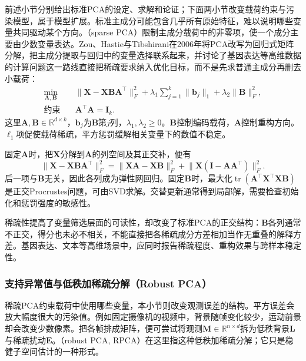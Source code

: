 前述小节分别给出标准PCA的设定、求解和论证；下面两小节改变载荷约束与污染模型，属于模型扩展。标准主成分可能包含几乎所有原始特征，难以说明哪些变量共同驱动某个方向。（sparse PCA）限制主成分载荷中的非零项，使一个成分主要由少数变量表达。Zou、Hastie与Tibshirani在2006年将PCA改写为回归式矩阵分解，把主成分提取与回归中的变量选择联系起来，并讨论了基因表达等高维数据的计算问题这一路线直接把稀疏要求纳入优化目标，而不是先求普通主成分再删去小载荷：
\begin{equation}
  \begin{aligned}
  \min_{\bm{A},\bm{B}}\quad&
    \lVert\bm{X}-\bm{X}\bm{B}\bm{A}^{\top}\rVert_F^2
    +\lambda_1\sum_{j=1}^{k}\lVert\bm{b}_j\rVert_1
    +\lambda_2\lVert\bm{B}\rVert_F^2,\\
  \text{约束}\quad&\bm{A}^{\top}\bm{A}=\bm{I}_k.
  \end{aligned}
  \label{eq:dim-sparse-pca}
\end{equation}
这里$\bm{A},\bm{B}\in\mathbb{R}^{d\times k}$，$\bm{b}_j$为$\bm{B}$第$j$列，$\lambda_1,\lambda_2\geq0$。$\bm{B}$控制编码载荷，$\bm{A}$控制重构方向。$\ell_1$项促使载荷稀疏，平方惩罚缓解相关变量下的数值不稳定。

固定$\bm{A}$时，把$\bm{X}$分解到$\bm{A}$的列空间及其正交补，便有
\[
  \lVert\bm{X}-\bm{X}\bm{B}\bm{A}^{\top}\rVert_F^2
  =\lVert\bm{X}\bm{A}-\bm{X}\bm{B}\rVert_F^2
   +\lVert\bm{X}(\bm{I}-\bm{A}\bm{A}^{\top})\rVert_F^2.
\]
后一项与$\bm{B}$无关，因此各列成为弹性网回归。固定$\bm{B}$时，最大化$\operatorname{tr}(\bm{A}^{\top}\bm{X}^{\top}\bm{X}\bm{B})$是正交Procrustes问题，可由SVD求解。交替更新通常得到局部解，需要检查初始化和惩罚强度的敏感性。

稀疏性提高了变量筛选层面的可读性，却改变了标准PCA的正交结构：$\bm{B}$各列通常不正交，得分也未必不相关，不能直接把各稀疏成分方差相加当作无重叠的解释方差。基因表达、文本等高维场景中，应同时报告稀疏程度、重构效果与跨样本稳定性。

\subsubsection{支持异常值与低秩加稀疏分解（Robust PCA）}
\label{sec:dim-robust-pca}

稀疏PCA约束载荷中使用哪些变量，本小节则改变观测误差的结构。平方误差会放大幅度很大的污染值。例如固定摄像机的视频中，背景随帧变化较少，运动前景却会改变少数像素。把各帧排成矩阵，便可尝试将观测$\bm{M}\in\mathbb{R}^{n\times d}$拆为低秩背景$\bm{L}$与稀疏扰动$\bm{E}$。（robust PCA, RPCA）在这里指这种低秩加稀疏分解；它只是稳健子空间估计的一种形式。

